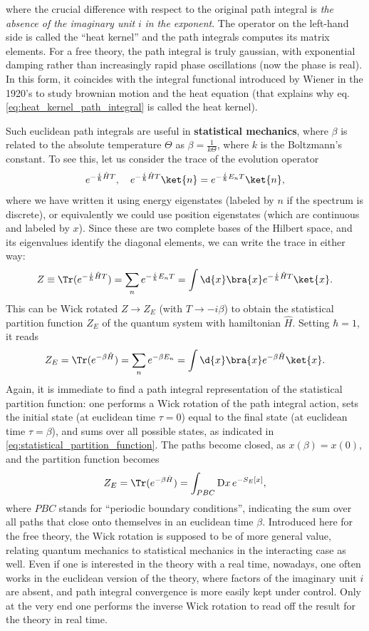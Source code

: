 where the crucial difference with respect to the original path integral is \textit{the absence of the imaginary unit} \(i\) \textit{in the exponent}. The operator on the left-hand side is called the “heat kernel” and the path integrals computes its matrix elements. For a free theory, the path integral is truly gaussian, with exponential damping rather than increasingly rapid phase oscillations (now the phase is real). In this form, it coincides with the integral functional introduced by Wiener in the 1920's to study brownian motion and the heat equation (that explains why eq. \eqref{eq:heat_kernel_path_integral} is called the heat kernel).

Such euclidean path integrals are useful in \textbf{statistical mechanics}, where \(\beta\) is related to the absolute temperature \(\Theta\) as \(\beta = \frac{1}{k \Theta}\), where \(k\) is the Boltzmann’s constant. To see this, let us consider the trace of the evolution operator
\[
    e^{-\frac{i}{\hbar} \hat{H} T}, \quad e^{-\frac{i}{\hbar} \hat{H} T} \ket{n} = e^{-\frac{i}{\hbar} E_n T} \ket{n},
\]
where we have written it using energy eigenstates (labeled by \(n\) if the spectrum is discrete), or equivalently we could use position eigenstates (which are continuous and labeled by \(x\)). Since these are two complete bases of the Hilbert space, and its eigenvalues identify the diagonal elements, we can write the trace in either way:
\[
    Z \equiv \Tr(e^{-\frac{i}{\hbar}\hat{H}T}) = \sum_{n} e^{-\frac{i}{\hbar}E_n T} = \int \d{x} \bra{x} e^{-\frac{i}{\hbar} \hat{H} T} \ket{x}.
\]
This can be Wick rotated \(Z \to  Z_E\) (with \(T \to - i \beta\)) to obtain the statistical partition function \(Z_E\) of the quantum system with hamiltonian \(\hat{H}\). Setting \(\hbar=1\), it reads
\begin{equation}
    Z_E = \Tr(e^{-\beta \hat{H}}) = \sum_{n} e^{- \beta E_n} = \int \d{x} \bra{x} e^{-\beta \hat{H}} \ket{x}.
    \label{eq:statistical_partition_function}
\end{equation}
Again, it is immediate to find a path integral representation of the statistical partition function: one performs a Wick rotation of the path integral action, sets the initial state (at euclidean time \(\tau = 0\)) equal to the final state (at euclidean time \(\tau = \beta\)), and sums over all possible states, as indicated in \eqref{eq:statistical_partition_function}. The paths become closed, as \(x(\beta)=x(0)\), and the partition function becomes
\[
    Z_E = \Tr(e^{-\beta \hat{H}}) = \int_{PBC} \mathrm{D} x\, e^{-S_E[x]},
\]
where \(PBC\) stands for “periodic boundary conditions”, indicating the sum over all paths that close onto themselves in an euclidean time \(\beta\).
Introduced here for the free theory, the Wick rotation is supposed to be of more general value, relating quantum mechanics to statistical mechanics in the interacting case as well. Even if one is interested in the theory with a real time, nowadays, one often works in the euclidean version of the theory, where factors of the imaginary unit \(i\) are absent, and path integral convergence is more easily kept under control. Only at the very end one performs the inverse Wick rotation to read off the result for the theory in real time.

